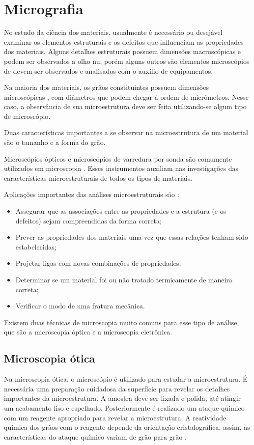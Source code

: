 \documentclass[
12pt,
openany, %
oneside, %
a4paper,			
english,			
brazil			        %
]{abntbibufjf}
\begin{document}
\section{Micrografia}
	
	No estudo da ciência dos materiais, usualmente é necessário ou desejável examinar os elementos estruturais e os defeitos que influenciam as propriedades dos materiais. Alguns detalhes estruturais possuem dimensões macroscópicas e podem ser observados a olho nu, porém alguns outros são elementos microscópios de devem ser observados e analisados com o auxílio de equipamentos.
	
	Na maioria dos materiais, os grãos constituintes possuem dimensões microscópicas \citep{callister2011materials}, com diâmetros que podem chegar à ordem de micrômetros. Nesse caso, a observância de sua microestrutura deve ser feita utilizando-se algum tipo de microscópio.
	
	Duas características importantes a se observar na microestrutura de um material são o tamanho e a forma do grão.
	
	Microscópios ópticos e microscópios de varredura por sonda são comumente utilizados em microscopia \cite{callister2011materials}. Esses instrumentos auxiliam nas investigações das características microestruturais de todos os tipos de materiais. 
	
	Aplicações importantes das análises microestruturais são \cite{callister2011materials}:
	\begin{itemize}
		\item Assegurar que as associações entre as propriedades e a estrutura (e os defeitos) sejam compreendidas da forma correta;
		\item Prever as propriedades dos materiais uma vez que essas relações tenham sido estabelecidas;
		\item Projetar ligas com novas combinações de propriedades;
		\item Determinar se um material foi ou não tratado termicamente de maneira correta;
		\item Verificar o modo de uma fratura mecânica.
	\end{itemize}

	Existem duas técnicas de microscopia muito comuns para esse tipo de análise, que são a microscopia óptica e a microscopia eletrônica.


\subsection{Microscopia ótica}
	Na microscopia ótica, o microscópio é utilizado para estudar a microestrutura. É necessária uma preparação cuidadosa da superfície para revelar os detalhes importantes da microestrutura. A amostra deve ser lixada e polida, até atingir um acabamento liso e espelhado. Posteriormente é realizado um ataque químico com um reagente apropriado para revelar a microestrutura. A reatividade química dos grãos com o reagente depende da orientação cristalográfica, assim, as características do ataque químico variam de grão para grão \cite{callister2011materials}.
	
\end{document}
